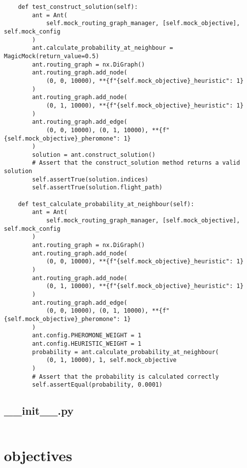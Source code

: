 \begin{verbatim}
    def test_construct_solution(self):
        ant = Ant(
            self.mock_routing_graph_manager, [self.mock_objective], self.mock_config
        )
        ant.calculate_probability_at_neighbour = MagicMock(return_value=0.5)
        ant.routing_graph = nx.DiGraph()
        ant.routing_graph.add_node(
            (0, 0, 10000), **{f"{self.mock_objective}_heuristic": 1}
        )
        ant.routing_graph.add_node(
            (0, 1, 10000), **{f"{self.mock_objective}_heuristic": 1}
        )
        ant.routing_graph.add_edge(
            (0, 0, 10000), (0, 1, 10000), **{f"{self.mock_objective}_pheromone": 1}
        )
        solution = ant.construct_solution()
        # Assert that the construct_solution method returns a valid solution
        self.assertTrue(solution.indices)
        self.assertTrue(solution.flight_path)

    def test_calculate_probability_at_neighbour(self):
        ant = Ant(
            self.mock_routing_graph_manager, [self.mock_objective], self.mock_config
        )
        ant.routing_graph = nx.DiGraph()
        ant.routing_graph.add_node(
            (0, 0, 10000), **{f"{self.mock_objective}_heuristic": 1}
        )
        ant.routing_graph.add_node(
            (0, 1, 10000), **{f"{self.mock_objective}_heuristic": 1}
        )
        ant.routing_graph.add_edge(
            (0, 0, 10000), (0, 1, 10000), **{f"{self.mock_objective}_pheromone": 1}
        )
        ant.config.PHEROMONE_WEIGHT = 1
        ant.config.HEURISTIC_WEIGHT = 1
        probability = ant.calculate_probability_at_neighbour(
            (0, 1, 10000), 1, self.mock_objective
        )
        # Assert that the probability is calculated correctly
        self.assertEqual(probability, 0.0001)

\end{verbatim}
\subsection{__init__.py}
\begin{verbatim}

\end{verbatim}
\section{objectives}

